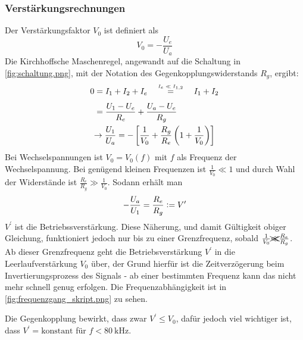 \subsubsection{Verstärkungsrechnungen}
Der Verstärkungsfaktor \(V_0\) ist definiert als
\begin{equation}
    V_0=-\frac{U_e}{U_a}    
\end{equation}
Die Kirchhoffsche Maschenregel, angewandt auf die Schaltung in \cref{fig:schaltung.png}, mit der Notation des Gegenkopplungswiderstands \(R_g\), ergibt:
\begin{gather}
    \begin{split}
        0&=I_1+I_2+I_e\quad\mathrel{ \overset{\mbox{\normalfont\tiny\sffamily \(I_e\ll I_{1,2}\)}}{ \underset{\mbox{\normalfont\tiny\sffamily }}{=} } }\quad I_1+I_2\\
        &=\frac{U_1-U_e}{R_e}+\frac{U_a-U_e}{R_g}
    \end{split}\\
    \rightarrow \frac{U_1}{U_a}=-\left[\frac{1}{V_0}+\frac{R_g}{R_e}\left(1+\frac{1}{V_0}\right)\right]\label{eq:Abschätzungen}
\end{gather}
Bei Wechselspannungen ist \(V_0=V_0(f)\) mit \(f\) als Frequenz der Wechselspannung. 
Bei genügend kleinen Frequenzen ist \(\frac{1}{V_0}\ll1\) und durch Wahl der Widerstände ist \(\frac{R_e}{R_g}\gg \frac{1}{V_0}\). Sodann erhält man 
\begin{equation}
    -\frac{U_a}{U_1}=\frac{R_e}{R_g}\vcentcolon= V^\prime
    \label{eq:Betriebssverstärkung}
\end{equation}
\(V^\prime\) ist die Betriebssverstärkung. Diese Näherung, und damit Gültigkeit obiger Gleichung, funktioniert jedoch nur bis zu einer Grenzfrequenz, sobald \(\frac{1}{V_0}\xcancel{\ll}\frac{R_e}{R_g}\). Ab dieser Grenzfrequenz geht die Betriebsverstärkung \(V^\prime\) in die Leerlaufverstärkung \(V_0\) über, der Grund hierfür ist die Zeitverzögerung beim Invertierungsprozess des Signals - ab einer bestimmten Frequenz kann das nicht mehr schnell genug erfolgen. Die Frequenzabhängigkeit ist in \cref{fig:frequenzgang_skript.png} zu sehen. 

Die Gegenkopplung bewirkt, dass zwar \(V^\prime\leq V_0\), dafür jedoch viel wichtiger ist, dass \(V^\prime=\text{konstant}\) für \(f<\qty{80}{\kilo\hertz}\). 


